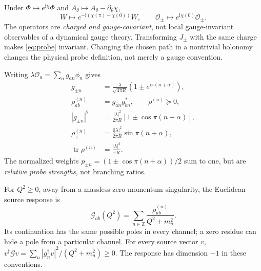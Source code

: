 \documentclass[11pt,a4paper]{article}
\newcommand{\ii}{\mathrm{i}}
\newcommand{\cO}{\mathcal O}
\newcommand{\cG}{\mathcal G}
\begin{document}
Under $\Phi\mapsto e^{\ii\chi}\Phi$ and
$A_\theta\mapsto A_\theta-\partial_\theta\chi$,
\begin{equation}
 W\mapsto e^{-\ii(\chi(\pi)-\chi(0))}W,\qquad
 \cO_\pm\mapsto e^{\ii\chi(0)}\cO_\pm .
\end{equation}
The operators are \emph{charged and gauge-covariant}, not local
gauge-invariant observables of a dynamical gauge theory. Transforming
$J_\pm$ with the same charge makes \eqref{eq:probe} invariant.
Changing the chosen path in a nontrivial holonomy changes the physical
probe definition, not merely a gauge convention.

Writing $\lambda\cO_a=\sum_n g_{an}\phi_n$ gives
\begin{align}
 g_{\pm n}&=\frac{\lambda}{\sqrt{4\pi R}}
             (1\pm e^{\ii\pi(n+\alpha)}),\\
 \rho^{(n)}_{ab}&=g_{an}g_{bn}^*,\qquad \rho^{(n)}\succeq0,\\
 |g_{\pm n}|^2&=\frac{|\lambda|^2}{2\pi R}
                  \left[1\pm\cos\pi(n+\alpha)\right],\\
 \rho^{(n)}_{+-}&=\frac{\ii|\lambda|^2}{2\pi R}
                   \sin\pi(n+\alpha),\\
 \operatorname{tr}\rho^{(n)}&=\frac{|\lambda|^2}{\pi R}.
 \label{eq:sum}
\end{align}
The normalized weights
$p_{\pm n}=(1\pm\cos\pi(n+\alpha))/2$ sum to one, but are
\emph{relative probe strengths}, not branching ratios.

For $Q^2\geq0$, away from a massless zero-momentum singularity,
the Euclidean source response is
\begin{equation}\label{eq:response}
 \cG_{ab}(Q^2)=\sum_{n\in\mathbb Z}
 \frac{\rho^{(n)}_{ab}}{Q^2+m_n^2}.
\end{equation}
Its continuation has the same possible poles in every channel;
a zero residue can hide a pole from a particular channel.
For every source vector $v$,
$v^\dagger\cG v=\sum_n|g_n^\dagger v|^2/(Q^2+m_n^2)\geq0$.
The response has dimension $-1$ in these conventions.
\end{document}

